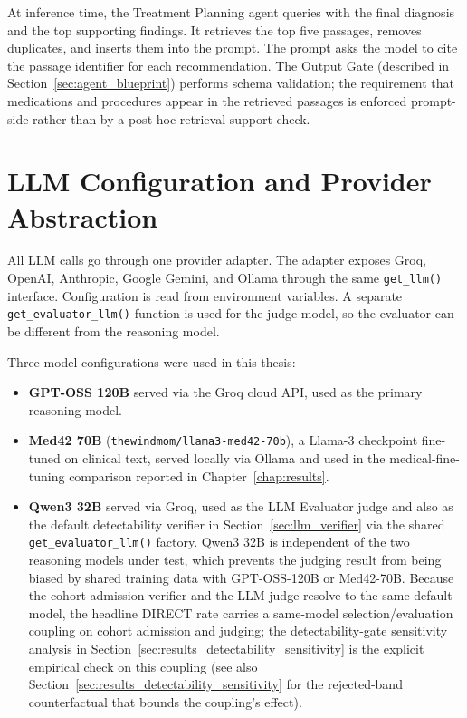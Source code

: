 At inference time, the Treatment Planning agent queries with the
final diagnosis and the top supporting findings. It retrieves the
top five passages, removes duplicates, and inserts them into the
prompt. The prompt asks the model to cite the passage identifier for
each recommendation. The Output Gate (described in
Section~\ref{sec:agent_blueprint}) performs schema validation; the
requirement that medications and procedures appear in the retrieved
passages is enforced prompt-side rather than by a post-hoc
retrieval-support check.

\FloatBarrier
\section{LLM Configuration and Provider Abstraction}
\label{sec:llm_config}

All LLM calls go through one provider adapter. The adapter exposes Groq,
OpenAI, Anthropic, Google Gemini, and Ollama through the same
\texttt{get\_llm()} interface. Configuration is read from environment
variables. A separate \texttt{get\_evaluator\_llm()} function is used for the
judge model, so the evaluator can be different from the reasoning model.

Three model configurations were used in this thesis:
\begin{itemize}
  \item \textbf{GPT-OSS 120B} served via the Groq cloud API, used as the
  primary reasoning model.
  \item \textbf{Med42 70B} (\texttt{thewindmom/llama3-med42-70b}), a Llama-3
  checkpoint fine-tuned on clinical text, served locally via Ollama and used
  in the medical-fine-tuning comparison reported in
  Chapter~\ref{chap:results}.
  \item \textbf{Qwen3 32B} served via Groq, used as the LLM Evaluator
  judge and also as the default detectability verifier in
  Section~\ref{sec:llm_verifier} via the shared
  \texttt{get\_evaluator\_llm()} factory. Qwen3 32B is independent of the
  two reasoning models under test, which prevents the judging result
  from being biased by shared training data with GPT-OSS-120B or
  Med42-70B. Because the cohort-admission verifier and the LLM judge
  resolve to the same default model, the headline DIRECT rate carries a
  same-model selection/evaluation coupling on cohort admission and
  judging; the detectability-gate sensitivity analysis in
  Section~\ref{sec:results_detectability_sensitivity} is the explicit
  empirical check on this coupling (see also
  Section~\ref{sec:results_detectability_sensitivity} for the
  rejected-band counterfactual that bounds the coupling's effect).
\end{itemize}

